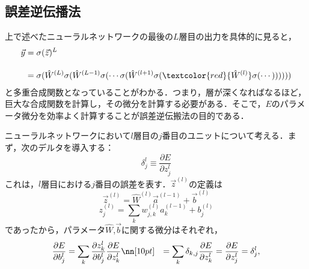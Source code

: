\subsection{誤差逆伝播法}
上で述べたニューラルネットワークの最後の$L$層目の出力を具体的に見ると，
\begin{align}
    \vec{y} &= \sigma(\vec{z})^{L}\\[10pt]
    &=\sigma(
        \hat{W}^{(L)}
        \sigma(
            \hat{W}^{(L-1)}
            \sigma(
                \cdots
                \sigma(
                    \hat{W}^{(l+1)}
                    \sigma(
                        \textcolor{red}{\hat{W}^{(l)}}
                        \sigma(
                            \cdots
                        )
                    )
                )
            )
        )
    )
\end{align}
と多重合成関数となっていることがわかる．つまり，層が深くなればなるほど，巨大な合成関数を計算し，その微分を計算する必要がある．そこで，$E$のパラメータ微分を効率よく計算することが誤差逆伝搬法の目的である．

ニューラルネットワークにおいて$l$層目の$j$番目のユニットについて考える．まず，次のデルタを導入する：
\begin{equation}
    \delta_{j}^{l} \equiv 
    \frac{\partial E}{\partial z^{l}_{j}}
\end{equation}
これは，$l$層目における$j$番目の誤差を表す．$\vec{z}^{(l)}$の定義は
\begin{equation}
    \vec{z}^{(l)}
    =\hat{W}^{(l)} \vec{a}^{(l-1)} + \vec{b}^{(l)}
\end{equation}
\begin{equation}
    z^{(l)}_{j}
    =\sum_{k}w^{(l)}_{j,k} a^{(l-1)}_{k} + b^{(l)}_{j}
\end{equation}
であったから，パラメータ$\hat{W}$,$\vec{b}$に関する微分はそれぞれ，
\begin{align}
    \frac{\partial E}{\partial b^{l}_{j}}
    &=\sum_{k}\frac{\partial z^{l}_k}{\partial b^{l}_{j}}
    \frac{\partial E}{\partial z^{l}_{k}}\nn[10pt]
    &=\sum_{k}\delta_{k,j}
    \frac{\partial E}{\partial z^{l}_{k}}
    =\frac{\partial E}{\partial z^{l}_{j}}=\delta^{l}_j,
\end{align}

